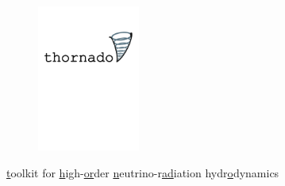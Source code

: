 \documentclass{beamer}
\begin{document}
\begin{frame}

  \begin{figure}[ht]
    \centering
    \includegraphics[width=0.3\textwidth]{fig.thornado_logo.png}
  \end{figure}

  \ul{t}oolkit for
  \ul{h}igh-\ul{or}der
  \ul{n}eutrino-r\ul{ad}iation hydr\ul{o}dynamics

\end{frame}
\end{document}

